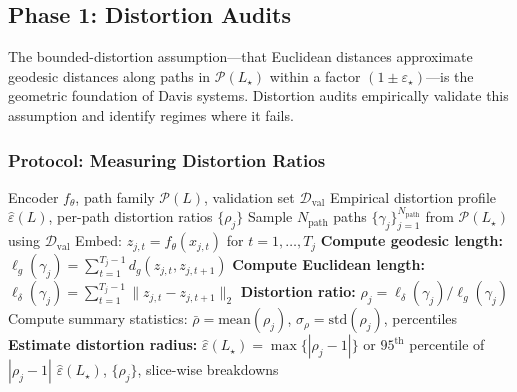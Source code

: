 \documentclass[11pt]{article}
\begin{document}
\subsection{Phase 1: Distortion Audits}
\label{subsec:distortion-audits}

The bounded-distortion assumption—that Euclidean distances approximate geodesic distances along paths in $\mathcal{P}(L_\star)$ within a factor $(1\pm\varepsilon_\star)$—is the geometric foundation of Davis systems. Distortion audits empirically validate this assumption and identify regimes where it fails.

\subsubsection{Protocol: Measuring Distortion Ratios}

\begin{algorithm}[H]
\caption{Distortion Audit on Validation Paths}
\label{alg:distortion-audit}
\begin{algorithmic}[1]
\Require Encoder $f_\theta$, path family $\mathcal{P}(L)$, validation set $\mathcal{D}_{\mathrm{val}}$
\Ensure Empirical distortion profile $\hat\varepsilon(L)$, per-path distortion ratios $\{\rho_j\}$
\State Sample $N_{\mathrm{path}}$ paths $\{\gamma_j\}_{j=1}^{N_{\mathrm{path}}}$ from $\mathcal{P}(L_\star)$ using $\mathcal{D}_{\mathrm{val}}$
    \State Embed: $z_{j,t} = f_\theta(x_{j,t})$ for $t=1,\dots,T_j$
    \State \textbf{Compute geodesic length:} $\ell_g(\gamma_j) = \sum_{t=1}^{T_j-1} d_g(z_{j,t}, z_{j,t+1})$ \quad {}
    \State \textbf{Compute Euclidean length:} $\ell_\delta(\gamma_j) = \sum_{t=1}^{T_j-1} \|z_{j,t} - z_{j,t+1}\|_2$
    \State \textbf{Distortion ratio:} $\rho_j = \ell_\delta(\gamma_j) / \ell_g(\gamma_j)$
\EndFor
\State Compute summary statistics: $\bar\rho = \text{mean}(\rho_j)$, $\sigma_\rho = \text{std}(\rho_j)$, percentiles
\State \textbf{Estimate distortion radius:} $\hat\varepsilon(L_\star) = \max\{|\rho_j - 1|\}$ or $95^{\text{th}}$ percentile of $|\rho_j - 1|$
\State \Return $\hat\varepsilon(L_\star)$, $\{\rho_j\}$, slice-wise breakdowns
\end{algorithmic}
\end{algorithm}
\end{document}
